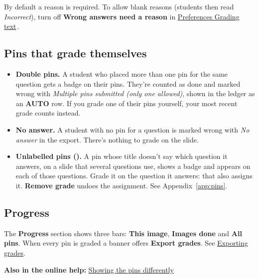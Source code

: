 By default a reason is required. To allow blank reasons (students then read \emph{Incorrect}), turn off \textbf{Wrong answers need a reason} in \href{https://github.com/agadin/micro-speed-grader/blob/main/docs/help/preferences.md\#grading-text}{Preferences \menuarrow{} Grading text}\,\onlinemark{}.

\subsection{Pins that grade themselves}\label{sec:grading:pins-that-grade-themselves}

\begin{itemize}[topsep=2pt, itemsep=4pt]
\item {}\label{sec:grading:double-pins}\textbf{Double pins.} A student who placed more than one pin for the same question gets a  badge on their pins. They're counted as done and marked wrong with \emph{Multiple pins submitted (only one allowed)}, shown in the ledger as an \textbf{AUTO} row. If you grade one of their pins yourself, your most recent grade counts instead.
\item {}\label{sec:grading:no-answer}\textbf{No answer.} A student with no pin for a question is marked wrong with \emph{No answer} in the export. There's nothing to grade on the slide.
\item {}\label{sec:grading:unlabelled-pins}\textbf{Unlabelled pins ().} A pin whose title doesn't say which question it answers, on a slide that several questions use, shows a  badge and appears on each of those questions. Grade it on the question it answers: that also assigns it. \textbf{Remove grade} undoes the assignment. See Appendix~\ref{app:pins}.
\end{itemize}

\subsection{Progress}\label{sec:grading:progress}

The \textbf{Progress} section shows three bars: \textbf{This image}, \textbf{Images done} and \textbf{All pins}. When every pin is graded a banner offers \textbf{Export grades}. See \hyperref[sec:export]{Exporting grades}.

{\small\textbf{Also in the online help:} \href{https://github.com/agadin/micro-speed-grader/blob/main/docs/help/grading.md\#showing-the-pins-differently}{Showing the pins differently}\,\onlinemark{}}
